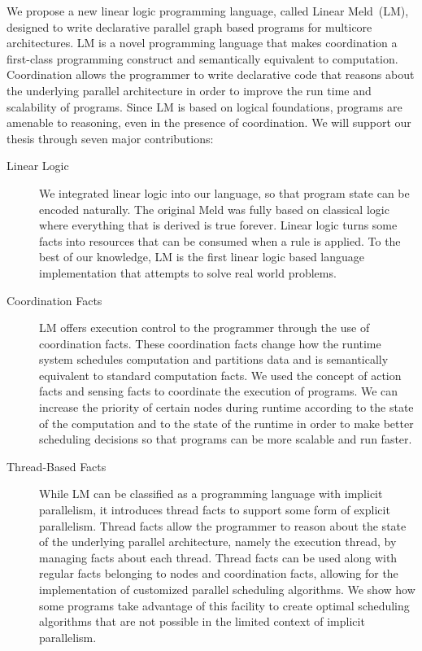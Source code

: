
We propose a new linear logic programming language, called Linear Meld~(LM),
designed to write declarative parallel graph based programs for multicore
architectures.  LM is a novel programming language that makes coordination a
first-class programming construct and semantically equivalent to computation.
Coordination allows the programmer to write declarative code that reasons about
the underlying parallel architecture in order to improve the run time and
scalability of programs. Since LM is based on logical foundations, programs are
amenable to reasoning, even in the presence of coordination. We will support our
thesis through seven major contributions:

\begin{description}
   
   \item[Linear Logic]

   We integrated linear logic into our language, so that program state can be
   encoded naturally. The original Meld was fully based on classical logic where
   everything that is derived is true forever. Linear logic turns some facts
   into resources that can be consumed when a rule is applied.  To the best of
   our knowledge, LM is the first linear logic based language implementation
   that attempts to solve real world problems.

   \item[Coordination Facts]
   
   LM offers execution control to the programmer through the use of coordination
   facts. These coordination facts change how the runtime system schedules
   computation and partitions data and is semantically equivalent to standard
   computation facts. We used the concept of action facts and sensing facts to
   coordinate the execution of programs. We can increase the priority of certain
   nodes during runtime according to the state of the computation and to the
   state of the runtime in order to make better scheduling decisions so that
   programs can be more scalable and run faster.

   \item[Thread-Based Facts]

   While LM can be classified as a programming language with implicit
   parallelism, it introduces thread facts to support some form of explicit
   parallelism. Thread facts allow the programmer to reason about the state of
   the underlying parallel architecture, namely the execution thread, by
   managing facts about each thread. Thread facts can be used along with regular
   facts belonging to nodes and coordination facts, allowing for the
   implementation of customized parallel scheduling algorithms. We show how some
   programs take advantage of this facility to create optimal scheduling
   algorithms that are not possible in the limited context of implicit
   parallelism.
   

\end{description}
